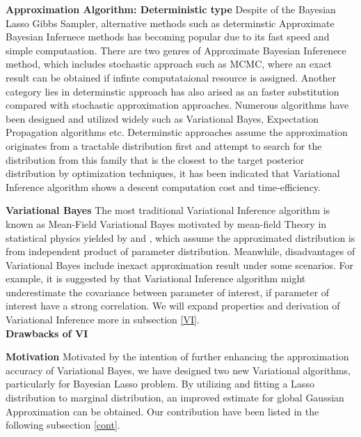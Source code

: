 \textbf{Approximation Algorithm: Deterministic type}
Despite of the Bayesian Lasso Gibbs Sampler, alternative methods such as determinstic Approximate Bayesian Infernece methods has becoming popular due to its fast speed and simple computaation. There are two genres of Approximate Bayesian Inferenece method, which includes stochastic approach such as MCMC, where an exact result can be obtained if infinte computataional resource is assigned. Another category lies in determinstic approach has also arised as an faster substitution compared with stochastic approximation approaches. Numerous algorithms have been designed and utilized widely such as Variational Bayes, Expectation Propagation algorithms etc. Determinstic approaches assume the approximation originates from a tractable distribution first and attempt to search for the distribution from this family that is the closest to the target posterior distribution by optimization techniques, it has been indicated that Variational Inference algorithm shows a descent computation cost and time-efficiency. 

\textbf{Variational Bayes}
The most traditional Variational Inference algorithm is known as Mean-Field Variational Bayes motivated by mean-field Theory in statistical physics yielded by 
\cite{jordan_ghahramani_jaakkola_saul_1998} and \cite{attias_1999}, which assume the approximated distribution is from independent product of parameter distribution.
Meanwhile, disadvantages of Variational Bayes include inexact approximation result under some scenarios. For example, it is suggested by \cite{bishop_2006} that Variational Inference algorithm might underestimate the covariance between parameter of interest, if parameter of interest have a strong correlation. We will expand properties and derivation of Variational Inference more in subsection \ref{VI}.\\

\textbf{Drawbacks of VI}



\textbf{Motivation}
Motivated by the intention of further enhancing the approximation accuracy of Variational Bayes, we have designed two new Variational algorithms, particularly for Bayesian Lasso problem. By utilizing and fitting a Lasso distribution to marginal distribution, an improved estimate for global Gaussian Approximation can be obtained. Our contribution have been listed in the following subsection \ref{cont}.\\



